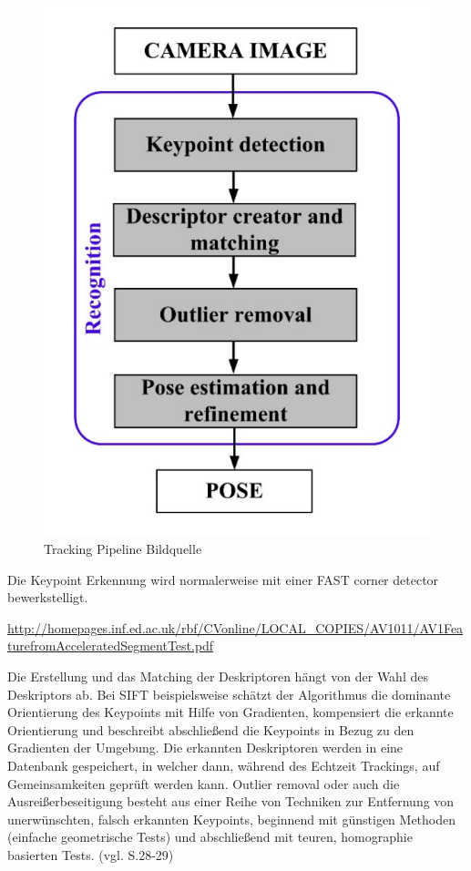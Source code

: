 \begin{figure}[H]
	\centering
	\includegraphics[scale=0.5]{tracking_pipeline.png}
	\caption{Tracking Pipeline Bildquelle \cite{natural_feature}}
\end{figure} 

Die Keypoint Erkennung wird normalerweise mit einer \glqq FAST corner detector\grqq{} bewerkstelligt.

\url{http://homepages.inf.ed.ac.uk/rbf/CVonline/LOCAL_COPIES/AV1011/AV1FeaturefromAcceleratedSegmentTest.pdf}

Die Erstellung und das Matching der Deskriptoren hängt von der Wahl des Deskriptors ab. Bei SIFT beispielsweise schätzt der Algorithmus die dominante Orientierung des Keypoints mit Hilfe von Gradienten, kompensiert die erkannte Orientierung und beschreibt abschließend die Keypoints in Bezug zu den Gradienten der Umgebung. Die erkannten Deskriptoren werden in eine Datenbank gespeichert, in welcher dann, während des Echtzeit Trackings, auf Gemeinsamkeiten geprüft werden kann. \glqq Outlier removal\grqq{} oder auch die Ausreißerbeseitigung besteht aus einer Reihe von Techniken zur Entfernung von unerwünschten, falsch erkannten Keypoints, beginnend mit günstigen Methoden (einfache geometrische Tests) und abschließend mit teuren, homographie basierten Tests. (vgl. \cite{natural_feature} S.28-29) 


